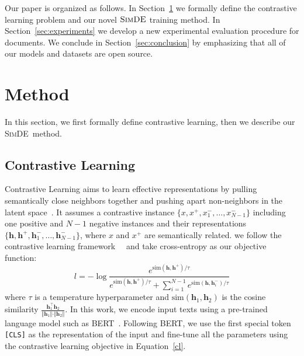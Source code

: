 \documentclass[11pt]{article}
\newcommand{\our}{\mbox{\textsc{SimDE}}}
\begin{document}

Our paper is organized as follows.
In Section~\ref{sec:method} we formally define the contrastive learning problem and our novel $\our$ training method.
In Section~\ref{sec:experiments} we develop a new experimental evaluation procedure for documents.
We conclude in Section~\ref{sec:conclusion} by emphasizing that all of our models and datasets are open source.

\section{Method}

\label{sec:method}
In this section, we first formally define contrastive learning, then we describe our \our~method.
\subsection{Contrastive Learning}
Contrastive Learning aims to learn effective representations by pulling semantically close neighbors together and pushing apart non-neighbors in the latent space~\cite{Hadsell2006DimensionalityRB}.
It assumes a contrastive instance $\{x, x^{+}, x_1^{-},\dots,x_{N-1}^{-}\}$ including one positive and $N-1$ negative instances and their representations $\{\mathbf{h}, \mathbf{h}^{+}, \mathbf{h}_1^{-}, \dots,
\mathbf{h}_{N-1}^{-}\}$, where $x$ and $x^{+}$ are semantically related.
we follow the contrastive learning framework~~\cite{Chen2020ASF, Li2022UCTopicUC} and take cross-entropy as our objective function:
\begin{equation}
\label{cl}
    l = -\log \frac{e^{\mathrm{sim}(\mathbf{h}, \mathbf{h}^{+})/\tau}}{e^{\mathrm{sim}(\mathbf{h}, \mathbf{h}^{+})/\tau}+ \sum_{i=1}^{N-1}e^{\mathrm{sim}(\mathbf{h}, \mathbf{h}_i^{-})/\tau}}
\end{equation}
where $\tau$ is a temperature hyperparameter and $\mathrm{sim}(\mathbf{h}_1, \mathbf{h}_2)$ is the cosine similarity $\frac{\mathbf{h}_1^{\top}\mathbf{h}_2}{\Vert \mathbf{h}_1 \Vert \cdot \Vert \mathbf{h}_2 \Vert}$.
In this work, we encode input texts using a pre-trained language model such as BERT~\cite{Devlin2019BERTPO}. Following BERT, we use the first special token \texttt{[CLS]} as the representation of the input and fine-tune all the parameters using the contrastive learning objective in Equation~\ref{cl}.
\end{document}
